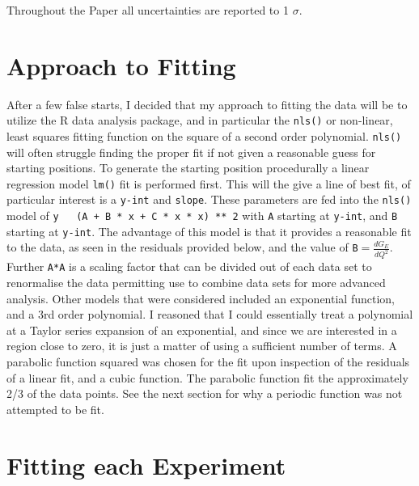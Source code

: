 \documentclass[12pt]{article}
\begin{document}
Throughout the Paper all uncertainties are reported to 1 $\sigma$.


\section{Approach to Fitting}

After a few false starts, I decided that my approach to fitting the data will be to utilize the R data analysis package, and in particular the \texttt{nls()} or non-linear, least squares fitting function on the square of a second order polynomial.
\texttt{nls()} will often struggle finding the proper fit if not given a reasonable guess for starting positions.
To generate the starting position procedurally a linear regression model \texttt{lm()} fit is performed first.
This will the give a line of best fit, of particular interest is a \texttt{y-int} and \texttt{slope}.
These parameters are fed into the \texttt{nls()} model of \texttt{y ~ (A + B * x + C * x * x) ** 2} with \texttt{A} starting at \texttt{y-int}, and \texttt{B} starting at \texttt{y-int}.
The advantage of this model is that it provides a reasonable fit to the data, as seen in the residuals provided below, and the value of \texttt{B}$=\frac{dG_E}{dQ^2}$.
Further \texttt{A*A} is a scaling factor that can be divided out of each data set to renormalise the data permitting use to combine data sets for more advanced analysis.
Other models that were considered included an exponential function, and a 3rd order polynomial. I reasoned that I could essentially treat a polynomial at a Taylor series expansion of an exponential, and since we are interested in a region close to zero, it is just a matter of using a sufficient number of terms. A parabolic function squared was chosen for the fit upon inspection of the residuals of a linear fit, and a cubic function. The parabolic function fit the approximately 2/3 of the data points. 
See the next section for why a periodic function was not attempted to be fit.

\section{Fitting each Experiment}
\end{document}
